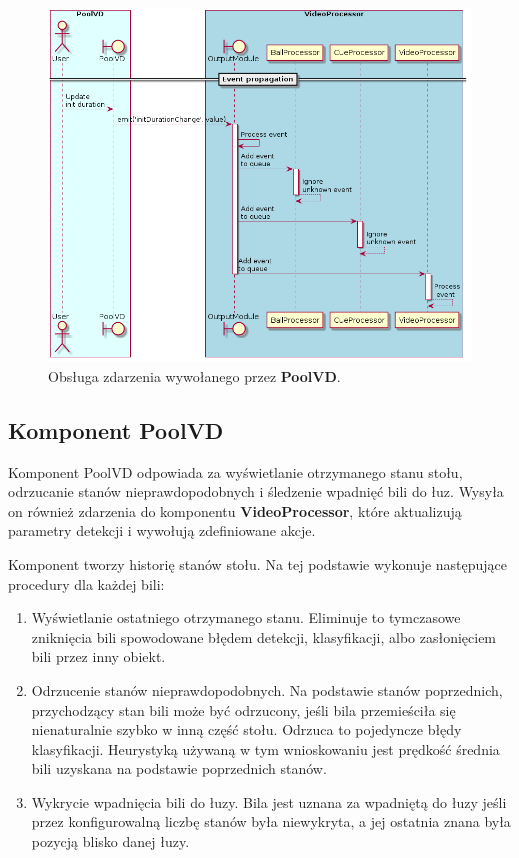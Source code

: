 \documentclass[12pt]{article}
\begin{document}
\begin{figure}[!htb]
    \centering
    \includegraphics[width=15cm]{./diagrams/out/pool_vd_events_sd.png}
    \caption{Obsługa zdarzenia wywołanego przez \textbf{PoolVD}.}
    \label{pool_vd_events_sd}
\end{figure}

\subsection{Komponent PoolVD}
Komponent PoolVD odpowiada za wyświetlanie otrzymanego stanu stołu, odrzucanie stanów nieprawdopodobnych i śledzenie wpadnięć bili do łuz. Wysyła on również zdarzenia do komponentu \textbf{VideoProcessor}, które aktualizują parametry detekcji i wywołują zdefiniowane akcje.

Komponent tworzy historię stanów stołu. Na tej podstawie wykonuje następujące procedury dla każdej bili:

\begin{enumerate} [noitemsep]
    \item Wyświetlanie ostatniego otrzymanego stanu. Eliminuje to tymczasowe zniknięcia bili spowodowane błędem detekcji, klasyfikacji, albo zasłonięciem bili przez inny obiekt.
    \item Odrzucenie stanów nieprawdopodobnych. Na podstawie stanów poprzednich, przychodzący stan bili może być odrzucony, jeśli bila przemieściła się nienaturalnie szybko w inną część stołu. Odrzuca to pojedyncze błędy klasyfikacji. Heurystyką używaną w tym wnioskowaniu jest prędkość średnia bili uzyskana na podstawie poprzednich stanów.
    \item Wykrycie wpadnięcia bili do łuzy. Bila jest uznana za wpadniętą do łuzy jeśli przez konfigurowalną liczbę stanów była niewykryta, a jej ostatnia znana była pozycją blisko danej łuzy.
\end{enumerate}
\end{document}

